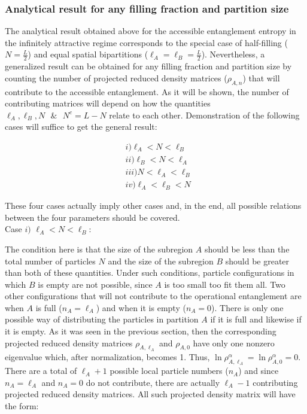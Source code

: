 \subsubsection{Analytical result for any filling fraction and partition size}

The analytical result obtained above for the accessible entanglement entropy in the infinitely attractive regime corresponds to the special case of half-filling ($N = \frac{L}{2}$) and equal spatial bipartitions ($\ell_{A} = \ell_{B} = \frac{L}{2}$). Nevertheless, a generalized result can be obtained for any filling fraction and partition size by counting the number of projected reduced density matrices ($\rho_{A,n}$) that will contribute to the accessible entanglement. As it will be shown, the number of contributing matrices will depend on how the quantities $\ell_{A}, \ell_{B}, N \text{ } \&  \text{ }N^{c} = L-N$ relate to each other. Demonstration of the following cases will suffice to get the general result:

\begin{align}
&i) \ell_{A} < N < \ell_{B} \nonumber \\
&ii) \ell_{B} < N < \ell_{A} \nonumber \\
&iii)  N < \ell_{A} < \ell_{B} \nonumber \\
&iv) \ell_{A} < \ell_{B} < N \nonumber
\end{align}

These four cases actually imply other cases and, in the end, all possible relations between the four parameters should be covered. \\

Case $i)$ $\ell_{A} < N < \ell_{B}$:

The condition here is that the size of the subregion $A$ should be less than the total number of particles $N$ and the size of the subregion $B$ should be greater than both of these quantities. Under such conditions, particle configurations in which $B$ is empty are not possible, since $A$ is too small too fit them all. Two other configurations that will not contribute to the operational entanglement are when $A$ is full ($n_{A} = \ell_{A}$) and when it is empty ($n_{A} = 0$). There is only one possible way of distributing the particles in partition $A$ if it is full and likewise if it is empty. As it was seen in the previous section, then the corresponding projected reduced density matrices $\rho_{A,\ell_{A}}$ and $\rho_{A,0}$ have only one nonzero eigenvalue which, after normalization, becomes 1. Thus, $\ln \rho_{A,\ell_{A}}^{\alpha} = \ln \rho_{A,0}^{\alpha} = 0$. There are a total of $\ell_{A}+1$ possible local particle numbers ($n_{A}$) and since $n_{A} = \ell_{A}$ and $n_{A} = 0$ do not contribute, there are actually $\ell_{A}-1$ contributing projected reduced density matrices. All such projected density matrix will have the form:

